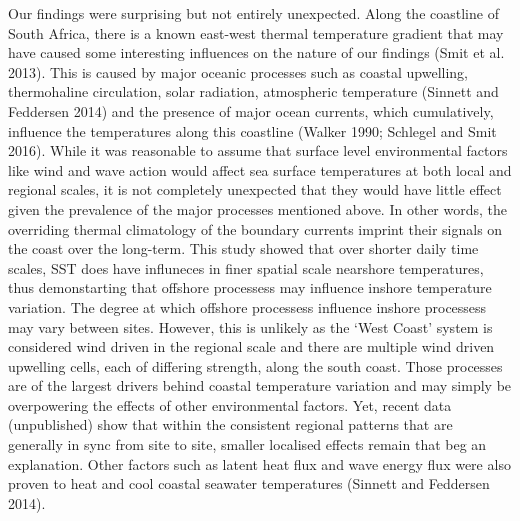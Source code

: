 \documentclass[10pt,a4paper,]{article}
\begin{document}
Our findings were surprising but not entirely unexpected. Along the
coastline of South Africa, there is a known east-west thermal
temperature gradient that may have caused some interesting influences on
the nature of our findings (Smit et al. 2013). This is caused by major
oceanic processes such as coastal upwelling, thermohaline circulation,
solar radiation, atmospheric temperature (Sinnett and Feddersen 2014)
and the presence of major ocean currents, which cumulatively, influence
the temperatures along this coastline (Walker 1990; Schlegel and Smit
2016). While it was reasonable to assume that surface level
environmental factors like wind and wave action would affect sea surface
temperatures at both local and regional scales, it is not completely
unexpected that they would have little effect given the prevalence of
the major processes mentioned above. In other words, the overriding
thermal climatology of the boundary currents imprint their signals on
the coast over the long-term. This study showed that over shorter daily
time scales, SST does have influneces in finer spatial scale nearshore
temperatures, thus demonstarting that offshore processess may influence
inshore temperature variation. The degree at which offshore processess
influence inshore processess may vary between sites. However, this is
unlikely as the `West Coast' system is considered wind driven in the
regional scale and there are multiple wind driven upwelling cells, each
of differing strength, along the south coast. Those processes are of the
largest drivers behind coastal temperature variation and may simply be
overpowering the effects of other environmental factors. Yet, recent
data (unpublished) show that within the consistent regional patterns
that are generally in sync from site to site, smaller localised effects
remain that beg an explanation. Other factors such as latent heat flux
and wave energy flux were also proven to heat and cool coastal seawater
temperatures (Sinnett and Feddersen 2014).
\end{document}
